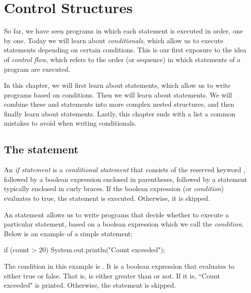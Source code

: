 \chapter{Control Structures}

So far, we have seen programs in which each statement is executed in order, one by one. Today we will learn about \emph{conditionals}, which allow us to execute statements depending on certain conditions. This is our first exposure to the idea of \emph{control flow}, which refers to the order (or sequence) in which statements of a program are executed.

In this chapter, we will first learn about  statements, which allow us to write programs based on conditions. Then we will learn about  statements. We will combine these  and  statements into more complex nested structures, and then finally learn about  statements. Lastly, this chapter ends with a list a common mistakes to avoid when writing conditionals.

\section{The  statement}

\begin{definition}
An \emph{if statement} is a \emph{conditional statement} that consists of the reserved keyword , followed by a boolean expression enclosed in parentheses, followed by a statement typically enclosed in curly braces. If the boolean expression (or \emph{condition}) evaluates to true, the statement is executed. Otherwise, it is skipped.
\end{definition}

An  statement allows us to write programs that decide whether to execute a particular statement, based on a boolean expression which we call the \emph{condition}. Below is an example of a simple  statement:

\begin{code}
if (count > 20) {
    System.out.println("Count exceeded");
}
\end{code}

\noindent The condition in this example is . It is a boolean expression that evaluates to either true or false. That is,  is either greater than  or not. If it is, ``Count exceeded" is printed. Otherwise, the  statement is skipped. 

